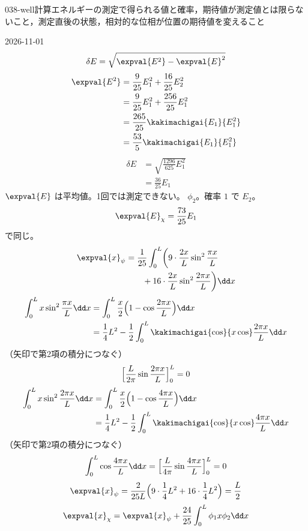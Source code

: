 \documentclass[uplatex,dvipdfmx,a4paper,11pt]{jsarticle}
\begin{document}
\begin{mondai}{038-well}{計算}{エネルギーの測定で得られる値と確率，期待値が測定値とは限らないこと，測定直後の状態，相対的な位相が位置の期待値を変えること}
\begin{kotaeutsushi}{2026-11-01}
\[ \delta E=\sqrt{\expval{E^{2}}-\expval{E}^{2}} \]
\begin{align*}
\expval{E^{2}}&=\frac{9}{25}E_{1}^{2}+\frac{16}{25}E_{2}^{2}\\
&=\frac{9}{25}E_{1}^{2}+\frac{256}{25}E_{1}^{2}\\
&=\frac{265}{25}\kakimachigai{E_{1}}{E_{1}^{2}}\\
&=\frac{53}{5}\kakimachigai{E_{1}}{E_{1}^{2}}
\end{align*}
\begin{align*}
\delta E&=\sqrt{\frac{1296}{625}E_{1}^{2}}\\
&=\frac{36}{25}E_{1}
\end{align*}
$\expval{E}$ は平均値。1回では測定できない。
$\phi_{2}$。確率 $1$ で $E_{2}$。
\[ \expval{E}_{\chi}=\frac{73}{25}E_{1} \]
で同じ。
\begin{align*}
\expval{x}_{\psi}&=\frac{1}{25}\int_{0}^{L}\biggl(9\cdot\frac{2x}{L}\sin^{2}\frac{\pi x}{L}\\
&\qquad+16\cdot\frac{2x}{L}\sin^{2}\frac{2\pi x}{L}\biggr)\dd x
\end{align*}
\begin{align*}
\int_{0}^{L}x\sin^{2}\frac{\pi x}{L}\dd x&=\int_{0}^{L}\frac{x}{2}\Bigl(1-\cos\frac{2\pi x}{L}\Bigr)\dd x\\
&=\frac{1}{4}L^{2}-\frac{1}{2}\int_{0}^{L}\kakimachigai{\cos}{x\cos}\frac{2\pi x}{L}\dd x
\end{align*}
（矢印で第2項の積分につなぐ）
\[ \Bigl[\frac{L}{2\pi}\sin\frac{2\pi x}{L}\Bigr]_{0}^{L}=0 \]
\begin{align*}
\int_{0}^{L}x\sin^{2}\frac{2\pi x}{L}\dd x&=\int_{0}^{L}\frac{x}{2}\Bigl(1-\cos\frac{4\pi x}{L}\Bigr)\dd x\\
&=\frac{1}{4}L^{2}-\frac{1}{2}\int_{0}^{L}\kakimachigai{\cos}{x\cos}\frac{4\pi x}{L}\dd x
\end{align*}
（矢印で第2項の積分につなぐ）
\[ \int_{0}^{L}\cos\frac{4\pi x}{L}\dd x=\Bigl[\frac{L}{4\pi}\sin\frac{4\pi x}{L}\Bigr]_{0}^{L}=0 \]
\[ \expval{x}_{\psi}=\frac{2}{25L}\Bigl(9\cdot\frac{1}{4}L^{2}+16\cdot\frac{1}{4}L^{2}\Bigr)=\frac{L}{2} \]
\begin{align*}
\expval{x}_{\chi}&=\expval{x}_{\psi}+\frac{24}{25}\int_{0}^{L}\phi_{1}x\phi_{2}\dd x\\

\end{align*}
\end{kotaeutsushi}
\end{mondai}
\end{document}
